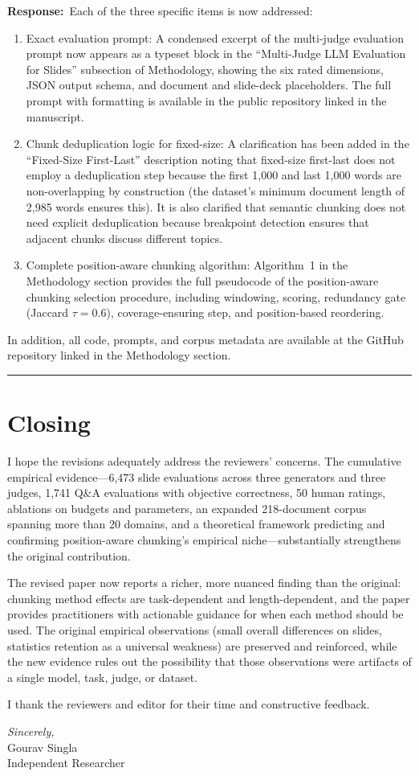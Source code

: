 \documentclass[11pt]{article}
\newcommand{\rresponse}[1]{\noindent\textcolor{response}{\textbf{Response:}}~#1\par\medskip\medskip}
\begin{document}
\rresponse{Each of the three specific items is now addressed:
\begin{enumerate}
    \item Exact evaluation prompt: A condensed excerpt of the multi-judge evaluation prompt now appears as a typeset block in the ``Multi-Judge LLM Evaluation for Slides'' subsection of Methodology, showing the six rated dimensions, JSON output schema, and document and slide-deck placeholders. The full prompt with formatting is available in the public repository linked in the manuscript.
    \item Chunk deduplication logic for fixed-size: A clarification has been added in the ``Fixed-Size First-Last'' description noting that fixed-size first-last does not employ a deduplication step because the first 1{,}000 and last 1{,}000 words are non-overlapping by construction (the dataset's minimum document length of 2{,}985 words ensures this). It is also clarified that semantic chunking does not need explicit deduplication because breakpoint detection ensures that adjacent chunks discuss different topics.
    \item Complete position-aware chunking algorithm: Algorithm~1 in the Methodology section provides the full pseudocode of the position-aware chunking selection procedure, including windowing, scoring, redundancy gate (Jaccard $\tau = 0.6$), coverage-ensuring step, and position-based reordering.
\end{enumerate}
In addition, all code, prompts, and corpus metadata are available at the GitHub repository linked in the Methodology section.}

\bigskip
\hrule
\bigskip

\section*{Closing}

I hope the revisions adequately address the reviewers' concerns. The cumulative empirical evidence---6{,}473 slide evaluations across three generators and three judges, 1{,}741 Q\&A evaluations with objective correctness, 50 human ratings, ablations on budgets and parameters, an expanded 218-document corpus spanning more than 20 domains, and a theoretical framework predicting and confirming position-aware chunking's empirical niche---substantially strengthens the original contribution.

The revised paper now reports a richer, more nuanced finding than the original: chunking method effects are task-dependent and length-dependent, and the paper provides practitioners with actionable guidance for when each method should be used. The original empirical observations (small overall differences on slides, statistics retention as a universal weakness) are preserved and reinforced, while the new evidence rules out the possibility that those observations were artifacts of a single model, task, judge, or dataset.

I thank the reviewers and editor for their time and constructive feedback.

\bigskip
\noindent\textit{Sincerely,}\\
Gourav Singla\\
Independent Researcher
\end{document}
